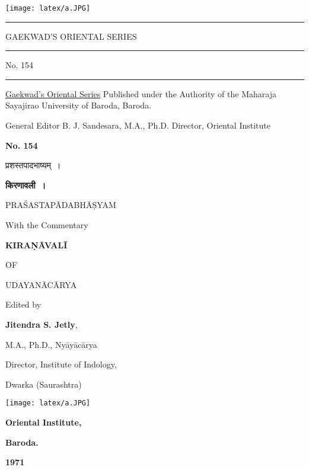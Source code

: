 \documentclass[11pt, openany]{book}
\begin{document}
\thispagestyle{empty}
\indent

\vspace{2.5cm}
\begin{center}
\texttt{[image: latex/a.JPG]}

\rule{0.7\linewidth}{0.5pt}

\vspace{6mm}
{\huge GAEKWAD'S}
\vspace{4mm}
{\huge ORIENTAL SERIES}
\rule{0.2\linewidth}{0.5pt}
{\large No. 154}

\rule{0.7\linewidth}{0.5pt}
\end{center}

\newpage
\thispagestyle{empty}
\noindent
\underline{Gaekwad's Oriental Series}
Published under the Authority
of the Maharaja Sayajirao
University of Baroda, Baroda.

\vspace{2cm}
\begin{flushright}
General Editor
B. J. Sandesara,
M.A., Ph.D.
Director, Oriental Institute
\end{flushright}

\vspace{2.5cm}
\noindent
\textbf{No. 154}

\vspace{2.5cm}
\begin{center}
प्रशस्तपादभाष्यम्~।

\vspace{3mm}
\textbf{\Huge किरणावली~।}
\end{center} 

\newpage
\thispagestyle{empty}
\begin{center}
{\large PRAŚASTAPĀDABHĀṢYAM}

\vspace{2mm}
{\large With the Commentary}

\vspace{2mm}
\textbf{\huge KIRAṆĀVALĪ}

\vspace{2mm}
{\large OF}

\vspace{2mm}
{\large UDAYANĀCĀRYA}

\vspace{2cm}
Edited by

\textbf{Jitendra S. Jetly},

\hspace{2cm} M.A., Ph.D., Nyāyācārya

Director, Institute of Indology,

Dwarka (Saurashtra)

\vspace{2cm}
\texttt{[image: latex/a.JPG]}

\vspace{2cm}
\textbf{\Large Oriental Institute,}

\textbf{\Large Baroda.}

\textbf{\Large 1971}
\end{center}
\end{document}
